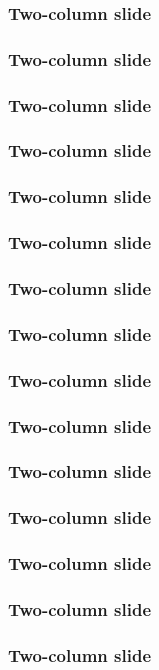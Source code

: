 \documentclass{beamer}
\begin{document}
\begin{frame}
	\frametitle{Two-column slide}	
\end{frame}

\begin{frame}
	\frametitle{Two-column slide}	
\end{frame}


\begin{frame}
	\frametitle{Two-column slide}	
\end{frame}


\begin{frame}
	\frametitle{Two-column slide}	
\end{frame}


\begin{frame}
	\frametitle{Two-column slide}	
\end{frame}


\begin{frame}
	\frametitle{Two-column slide}	
\end{frame}

\begin{frame}
	\frametitle{Two-column slide}	
\end{frame}

\begin{frame}
	\frametitle{Two-column slide}	
\end{frame}


\begin{frame}
	\frametitle{Two-column slide}	
\end{frame}


\begin{frame}
	\frametitle{Two-column slide}	
\end{frame}


\begin{frame}
	\frametitle{Two-column slide}	
\end{frame}


\begin{frame}
	\frametitle{Two-column slide}	
\end{frame}

\begin{frame}
	\frametitle{Two-column slide}	
\end{frame}

\begin{frame}
	\frametitle{Two-column slide}	
\end{frame}


\begin{frame}
	\frametitle{Two-column slide}	
\end{frame}
\end{document}
